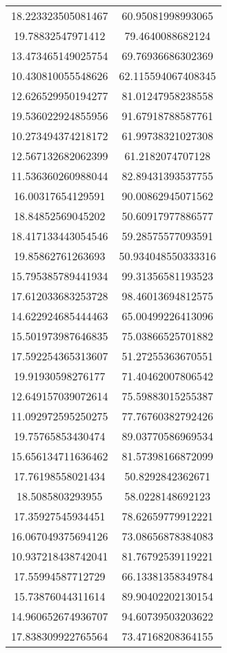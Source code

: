\begin{table}
\begin{tabular}{cc}
18.223323505081467 & 60.95081998993065 \\
19.78832547971412 & 79.4640088682124 \\
13.473465149025754 & 69.76936686302369 \\
10.430810055548626 & 62.115594067408345 \\
12.626529950194277 & 81.01247958238558 \\
19.536022924855956 & 91.67918788587761 \\
10.273494374218172 & 61.99738321027308 \\
12.567132682062399 & 61.2182074707128 \\
11.536360260988044 & 82.89431393537755 \\
16.00317654129591 & 90.00862945071562 \\
18.84852569045202 & 50.60917977886577 \\
18.417133443054546 & 59.28575577093591 \\
19.85862761263693 & 50.934048550333316 \\
15.795385789441934 & 99.31356581193523 \\
17.612033683253728 & 98.46013694812575 \\
14.622924685444463 & 65.00499226413096 \\
15.501973987646835 & 75.03866525701882 \\
17.592254365313607 & 51.27255363670551 \\
19.91930598276177 & 71.40462007806542 \\
12.649157039072614 & 75.59883015255387 \\
11.092972595250275 & 77.76760382792426 \\
19.75765853430474 & 89.03770586969534 \\
15.656134711636462 & 81.57398166872099 \\
17.76198558021434 & 50.8292842362671 \\
18.5085803293955 & 58.0228148692123 \\
17.35927545934451 & 78.62659779912221 \\
16.067049375694126 & 73.08656878384083 \\
10.937218438742041 & 81.76792539119221 \\
17.55994587712729 & 66.13381358349784 \\
15.73876044311614 & 89.90402202130154 \\
14.960652674936707 & 94.60739503203622 \\
17.838309922765564 & 73.47168208364155 \\

\end{tabular}
\end{table}
